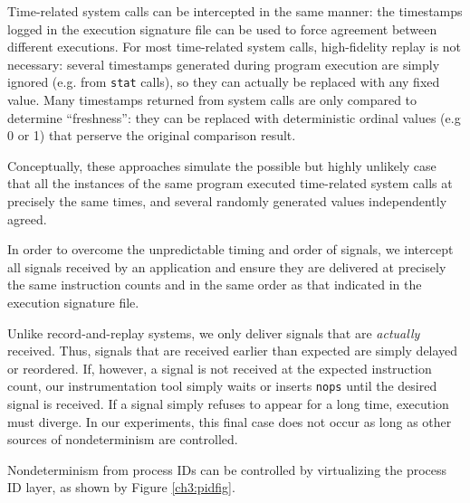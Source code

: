 Time-related system calls can
be intercepted in the same manner:
the timestamps logged
in the execution signature file
can be used to force agreement
between different executions.
For most time-related system calls,
high-fidelity replay is not necessary:
several timestamps generated
during program execution are simply ignored
(e.g. from \texttt{stat} calls),
so they can actually be replaced with any 
fixed value. Many timestamps
returned from system calls are only compared to
determine ``freshness'': they
can be replaced with deterministic ordinal values (e.g 0 or 1) that 
perserve the original comparison result.

Conceptually, these approaches simulate the possible but highly
unlikely case that all the instances of the same program
executed time-related system calls
at precisely the same times,
and several randomly generated values independently agreed. \newline

 \newline
In order to overcome the unpredictable timing and 
order of signals, we intercept all signals received by 
an application and ensure they are delivered
at precisely the same instruction counts
and in the same order as that indicated
in the execution signature file.

Unlike record-and-replay systems, we only
deliver signals that are {\em actually}
received. Thus, signals that are received earlier
than expected are simply delayed or reordered. If,
however, a signal is not received at the expected
instruction count, our instrumentation tool
simply waits or inserts \texttt{nops} until the 
desired signal is received. If a signal simply
refuses to appear for a long time, execution
must diverge. In our experiments,
this final case does not occur as long
as other sources of nondeterminism are controlled. \newline

 \newline
Nondeterminism from process IDs
can be controlled by virtualizing the process ID
layer, as shown by Figure \ref{ch3:pidfig}.

